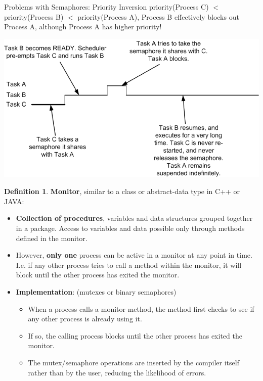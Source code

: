 \documentclass[12pt,a4paper]{article}
\theoremstyle{definition}
\newtheorem{definition}{Definition}[section]
\newenvironment{myitemize}
{ \begin{itemize}
    \setlength{\itemsep}{5pt}
    \setlength{\parskip}{0pt}
    \setlength{\parsep}{0pt}     }
{ \end{itemize}                  }
\begin{document}
\begin{tcolorbox}
	\textsf{Problems with Semaphores: Priority Inversion}	priority(Process C) $<$ priority(Process B) $<$ priority(Process A), Process B effectively blocks out Process A, although Process A has higher priority!
	
	\includegraphics[scale=0.5]{m1/priorityInversion}
	\centering
\end{tcolorbox}

\begin{definition}{\textbf{Monitor}}, similar to a class or abstract-data type in C++ or JAVA:
	\begin{myitemize}
		\item \textbf{Collection of procedures}, variables and data structures grouped together in a package. Access to variables and data possible only through methods defined in the monitor.
		\item However, \textbf{only one} process can be active in a monitor at any point in time. I.e. if any other process tries to call a method within the monitor, it will block until the other process has exited the monitor.
		\item \textbf{Implementation}: (mutexes or binary semaphores)
		\begin{myitemize}
			\item When a process calls a monitor method, the method first checks to see if any other process is already using it. 
			\item If so, the calling process blocks until the other process has exited the monitor.
			\item The mutex/semaphore operations are inserted by the compiler itself rather than by the user, reducing the likelihood of errors.
		\end{myitemize}
	\end{myitemize}
\end{definition}
\end{document}
